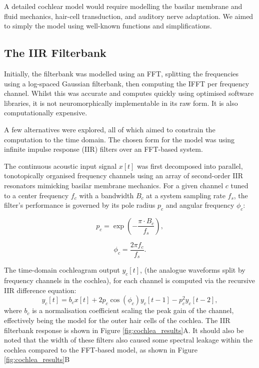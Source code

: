 A detailed cochlear model would require modelling the basilar membrane and fluid mechanics, hair-cell transduction, and auditory nerve adaptation. We aimed to simply the model using well-known functions and simplifications. 

\subsection{The IIR Filterbank}

Initially, the filterbank was modelled using an FFT, splitting the frequencies using a log-spaced Gaussian filterbank, then computing the IFFT per frequency channel. Whilst this was accurate and computes quickly using optimised software libraries, it is not neuromorphically implementable in its raw form. It is also computationally expensive.

A few alternatives were explored, all of which aimed to constrain the computation to the time domain. The chosen form for the model was using infinite impulse response (IIR) filters over an FFT-based system.

The continuous acoustic input signal $x[t]$ was first decomposed into parallel, tonotopically organised frequency channels using an array of second-order IIR resonators mimicking basilar membrane mechanics. For a given channel $c$ tuned to a center frequency $f_c$ with a bandwidth $B_c$ at a system sampling rate $f_s$, the filter's performance is governed by its pole radius $p_c$ and angular frequency $\phi_c$:

\begin{equation}
    p_c = \exp\left( -\frac{\pi \cdot B_c}{f_s} \right),
\end{equation}

\begin{equation}
    \phi_c = \frac{2\pi f_c}{f_s}.
\end{equation}

The time-domain cochleagram output $y_c[t]$, (the analogue waveforms split by frequency channels in the cochlea), for each channel is computed via the recursive IIR difference equation:
\begin{equation}
    y_c[t] = b_c x[t] + 2p_c \cos(\phi_c) y_c[t-1] - p_c^2 y_c[t-2],
\end{equation}
where $b_c$ is a normalisation coefficient scaling the peak gain of the channel, effectively being the model for the outer hair cells of the cochlea. The IIR filterbank response is shown in Figure \ref{fig:cochlea_results}A. It should also be noted that the width of these filters also caused some spectral leakage within the cochlea compared to the FFT-based model, as shown in Figure \ref{fig:cochlea_results}B

